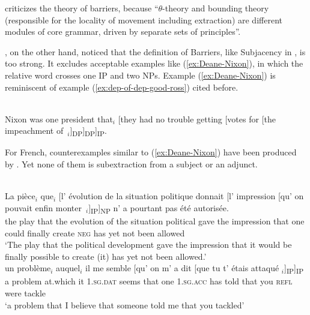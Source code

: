 \citet[82]{Stepanov.2007} criticizes the theory of barriers, because ``$\theta$-theory and bounding theory (responsible for the locality of movement including extraction) are different modules of core grammar, driven by separate sets of principles''. 

\citet{Deane.1991}, on the other hand, noticed that the definition of Barriers, like Subjacency in \citet{Chomsky.1973}, is too strong. It excludes acceptable examples like (\ref{ex:Deane-Nixon}), in which the relative word crosses one IP and two NPs. Example (\ref{ex:Deane-Nixon}) is reminiscent of example (\ref{ex:dep-of-dep-good-ross}) cited before.

\ea \citep[10]{Deane.1991}\\
Nixon was one president that$_i$ [they had no trouble getting [votes for [the impeachment of~\trace{}$_i$]\textsubscript{DP}]\textsubscript{DP}]\textsubscript{IP}. 
\label{ex:Deane-Nixon}
\z 

For French, counterexamples similar to (\ref{ex:Deane-Nixon}) have been produced by \citet{Godard.1988}. Yet none of them is subextraction from a subject or an adjunct. 

\eal 
\ex \citep[38]{Godard.1988}\nopagebreak\\
\gll La pièce$_i$ que$_i$ [l' évolution de la situation politique donnait [l' impression [qu' on pouvait enfin monter~\trace{}$_i$]\textsubscript{IP}]\textsubscript{NP} n' a pourtant pas été autorisée.\\
the play that \sbar{}the evolution of the situation political gave \sbar{}the impression \sbar{}that one could finally create \textsc{neg} has yet not been allowed\\
\glt `The play that the political development gave the impression that it would be finally possible to create (it) has yet not been allowed.' 
\label{ex:Godard-situation-politique}
\pagebreak
\ex \citep[59]{Godard.1988}\\
\gll un problème$_i$ auquel$_i$ il me semble [qu' on m' a dit [que tu t' étais attaqué \trace{}$_i$]\textsubscript{IP}]\textsubscript{IP}\\
a problem at.which it \textsc{1.sg.dat} seems that one \textsc{1.sg.acc} has told that you \textsc{refl} were tackle\\
\glt `a problem that I believe that someone told me that you tackled'
\label{ex:Godard-auquel-ldd}
\zl 


